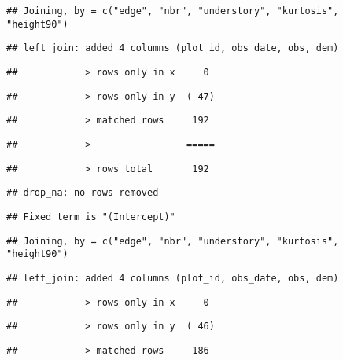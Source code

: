 \documentclass[
]{article}
\begin{document}
\begin{verbatim}
## Joining, by = c("edge", "nbr", "understory", "kurtosis", "height90")
\end{verbatim}

\begin{verbatim}
## left_join: added 4 columns (plot_id, obs_date, obs, dem)
\end{verbatim}

\begin{verbatim}
##            > rows only in x     0
\end{verbatim}

\begin{verbatim}
##            > rows only in y  ( 47)
\end{verbatim}

\begin{verbatim}
##            > matched rows     192
\end{verbatim}

\begin{verbatim}
##            >                 =====
\end{verbatim}

\begin{verbatim}
##            > rows total       192
\end{verbatim}

\begin{verbatim}
## drop_na: no rows removed
\end{verbatim}

\begin{verbatim}
## Fixed term is "(Intercept)"
\end{verbatim}

\begin{verbatim}
## Joining, by = c("edge", "nbr", "understory", "kurtosis", "height90")
\end{verbatim}

\begin{verbatim}
## left_join: added 4 columns (plot_id, obs_date, obs, dem)
\end{verbatim}

\begin{verbatim}
##            > rows only in x     0
\end{verbatim}

\begin{verbatim}
##            > rows only in y  ( 46)
\end{verbatim}

\begin{verbatim}
##            > matched rows     186
\end{verbatim}
\end{document}
